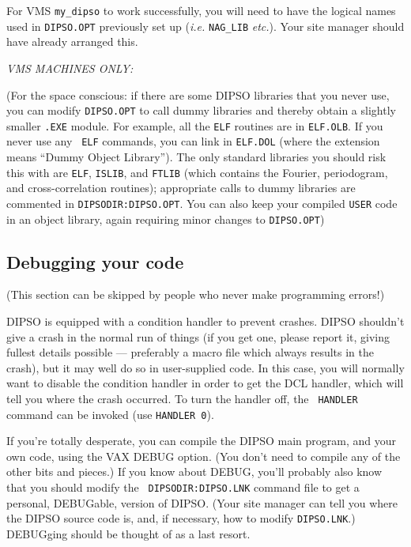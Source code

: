 For VMS {\tt my\_dipso} to work successfully, you will need to have the
logical names used in {\tt DIPSO.OPT} previously set up ({\em i.e.}
{\tt NAG\_LIB} {\em etc.}). Your site manager should have already
arranged this.

{\em VMS MACHINES ONLY:}

(For the space conscious:  if there are some DIPSO libraries that you
never use, you can modify {\tt DIPSO.OPT} to call dummy libraries and
thereby obtain a slightly smaller {\tt .EXE} module. For example, all
the {\tt ELF} routines are in {\tt ELF.OLB}. If you never use any {\tt
ELF} commands, you can link in {\tt ELF.DOL} (where the extension
means ``Dummy Object Library''). The only standard libraries you
should risk this  with are {\tt ELF}, {\tt ISLIB}, and {\tt FTLIB}
(which contains the Fourier, periodogram, and cross-correlation
routines);  appropriate calls to dummy libraries are commented in
{\tt DIPSODIR:DIPSO.OPT}. You can also keep your compiled {\tt USER} code in
an object library, again requiring minor changes to {\tt DIPSO.OPT})

\subsection {Debugging your code}

(This section can be skipped by people who never make programming
errors!)

DIPSO is equipped with a condition handler to prevent crashes. DIPSO
shouldn't give a crash in the normal run of things (if you get one,
please report it, giving fullest details possible --- preferably a
macro file which always results in the crash), but it may well do so
in user-supplied code. In this case, you will normally want to disable
the condition handler in order to get the DCL handler, which will tell
you where the crash occurred. To turn the handler off, the {\tt
HANDLER} command can be invoked (use {\tt HANDLER 0}).

If you're totally desperate, you can compile the DIPSO main program,
and your own code, using the VAX DEBUG option. (You don't need to
compile any of the other bits and pieces.) If you know about DEBUG,
you'll probably also know that you should modify the {\tt
DIPSODIR:\-DIPSO\-.LNK} command file to get a personal, DEBUGable, version
of DIPSO. (Your site manager can tell you where the DIPSO source code
is, and, if necessary, how to modify {\tt DIPSO.LNK}.) DEBUGging should be
thought of as a last resort.

